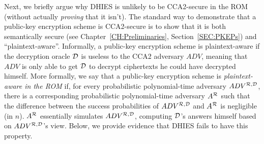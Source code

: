 
%

Next, we briefly argue why DHIES is unlikely to be CCA2-secure in the ROM
(without actually {\it proving} that it isn't).  The standard way to
demonstrate that a public-key encryption scheme is CCA2-secure is to show that
it is both semantically secure (see Chapter~\ref{CH:Preliminaries},
Section~\ref{SEC:PKEPs}) and ``plaintext-aware''. 
Informally, a public-key encryption scheme is plaintext-aware if the
decryption oracle $\mathcal{D}$ is useless to the CCA2 adversary $ADV$, meaning that
$ADV$ is only able to get $\mathcal{D}$ to decrypt ciphertexts he could have
decrypted himself. 
More formally, we say that a public-key encryption scheme is {\it
plaintext-aware in the ROM} if, for every probabilistic polynomial-time
adversary $ADV^{\mathcal{R},\mathcal{D}}$, there is a corresponding probabilistic
polynomial-time adversary $A^{\mathcal{R}}$ such that the difference between the
success probabilities of $ADV^{\mathcal{R},\mathcal{D}}$ and $A^{\mathcal{R}}$ 
is negligible (in $n$). $A^{\mathcal{R}}$ essentially simulates
$ADV^{\mathcal{R},\mathcal{D}}$, computing $\mathcal{D}$'s answers himself 
based on $ADV^{\mathcal{R},\mathcal{D}}$'s view. Below, we provide evidence that DHIES
fails to have this property.

